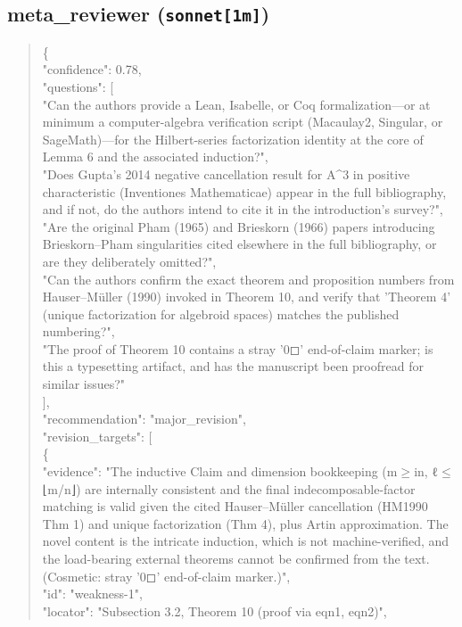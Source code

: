 \documentclass[11pt]{article}
\begin{document}
\subsection*{meta\_reviewer (\texttt{sonnet[1m]})}
\begin{quote}\small\ttfamily\raggedright
\{\\
  "confidence": 0.78,\\
  "questions": [\\
    "Can the authors provide a Lean, Isabelle, or Coq formalization---or at minimum a computer-algebra verification script (Macaulay2, Singular, or SageMath)---for the Hilbert-series factorization identity at the core of Lemma 6 and the associated induction?",\\
    "Does Gupta's 2014 negative cancellation result for A\^{}3 in positive characteristic (Inventiones Mathematicae) appear in the full bibliography, and if not, do the authors intend to cite it in the introduction's survey?",\\
    "Are the original Pham (1965) and Brieskorn (1966) papers introducing Brieskorn--Pham singularities cited elsewhere in the full bibliography, or are they deliberately omitted?",\\
    "Can the authors confirm the exact theorem and proposition numbers from Hauser--Müller (1990) invoked in Theorem 10, and verify that 'Theorem 4' (unique factorization for algebroid spaces) matches the published numbering?",\\
    "The proof of Theorem 10 contains a stray '0◻' end-of-claim marker; is this a typesetting artifact, and has the manuscript been proofread for similar issues?"\\
  ],\\
  "recommendation": "major\_revision",\\
  "revision\_targets": [\\
    \{\\
      "evidence": "The inductive Claim and dimension bookkeeping (m\ensuremath{\ge}in, ℓ\ensuremath{\le}⌊m/n⌋) are internally consistent and the final indecomposable-factor matching is valid given the cited Hauser--Müller cancellation (HM1990 Thm 1) and unique factorization (Thm 4), plus Artin approximation. The novel content is the intricate induction, which is not machine-verified, and the load-bearing external theorems cannot be confirmed from the text. (Cosmetic: stray '0◻' end-of-claim marker.)",\\
      "id": "weakness-1",\\
      "locator": "Subsection 3.2, Theorem 10 (proof via eqn1, eqn2)",\\

\end{quote}
\end{document}
